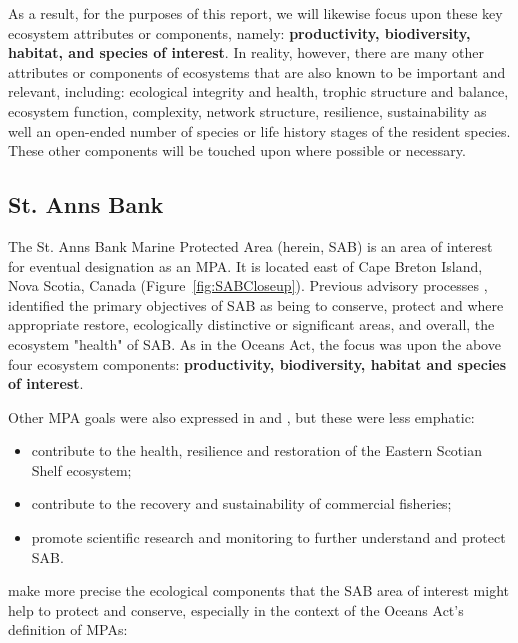 \documentclass[letterpaper,portrait,11pt]{scrartcl}
\numberwithin{equation}{section}    %
\numberwithin{figure}{section}    %
\numberwithin{table}{section}       %
\begin{document}
As a result, for the purposes of this report, we will likewise focus upon these key ecosystem attributes or components, namely: \textbf{productivity, biodiversity, habitat, and  species of interest}. In reality, however, there are many other attributes or components of ecosystems that are also known to be important and relevant, including: ecological integrity and health, trophic structure and balance, ecosystem function, complexity, network structure, resilience, sustainability as well an open-ended number of species or life history stages of the resident species. These other components will be touched upon where possible or necessary.

\subsection{St. Anns Bank}
The St. Anns Bank Marine Protected Area (herein, SAB) is an area of interest for eventual designation as an MPA. It is located east of Cape Breton Island, Nova Scotia, Canada (Figure~\ref{fig:SABCloseup}). Previous advisory processes \parencites{DFO:2012:conservation, Kenchington:2013:sab}, identified the primary objectives of SAB as being to conserve, protect and where appropriate restore, ecologically distinctive or significant areas, and overall, the ecosystem "health" of SAB. As in the Oceans Act, the focus was upon the above four ecosystem components: \textbf{productivity, biodiversity, habitat and species of interest}.

Other MPA goals were also expressed in \textcite{DFO:2012:conservation} and \textcite{Kenchington:2013:sab}, but these were less emphatic:

\begin{itemize}
	\item contribute to the health, resilience and restoration of the Eastern Scotian Shelf ecosystem;
	\item contribute to the recovery and sustainability of commercial fisheries;
	\item promote scientific research and monitoring to further understand and protect SAB.
\end{itemize}

\textcite{Ford:2013:sab} make more precise the ecological components that the SAB area of interest might help to protect and conserve, especially in the context of the Oceans Act's definition of MPAs:
\end{document}
